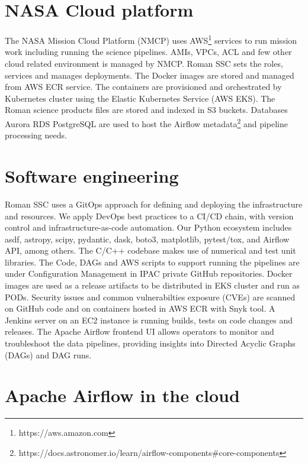 \documentclass[11pt,twoside]{article}
\begin{document}
\section{NASA Cloud platform}

The NASA Mission Cloud Platform (NMCP) uses AWS\footnote{https://aws.amazon.com} services to run mission work including running the science pipelines. AMIs, VPCs, ACL and few other cloud related environment is managed by NMCP. Roman SSC sets the roles, services and manages deployments.
The Docker images are stored and managed from AWS ECR service.
The containers are provisioned and orchestrated by Kubernetes cluster using the Elastic Kubernetes Service (AWS EKS).
The Roman science products files are stored and indexed in S3 buckets.
Databases Aurora RDS PostgreSQL are used to host the Airflow metadata\footnote{https://docs.astronomer.io/learn/airflow-components\#core-components} and pipeline processing needs.

\section{Software engineering}

Roman SSC uses a GitOps approach for defining and deploying the infrastructure and resources. We apply DevOps best practices to a CI/CD chain, with version control and infrastructure-as-code automation. Our Python ecosystem includes asdf, astropy, scipy, pydantic, dask, boto3, matplotlib, pytest/tox, and Airflow API, among others. The C/C++ codebase makes use of numerical and test unit libraries.
The Code, DAGs and AWS scripts to support running the pipelines are under Configuration Management in IPAC private GitHub repositories.
Docker images are used as a release artifacts to be distributed in EKS cluster and run as PODs.
Security issues and common vulnerabilties exposure (CVEs) are scanned on GitHub code and on containers hosted in AWS ECR with Snyk tool.
A Jenkins server on an EC2 instance is running builds, tests on code changes and releases.
The Apache Airflow frontend UI allows operators to monitor and troubleshoot the data pipelines, providing insights into Directed Acyclic Graphs (DAGs) and DAG runs.

\section{Apache Airflow in the cloud}
\end{document}
